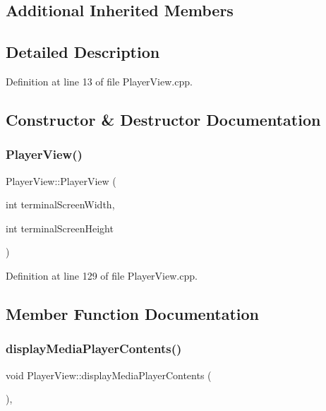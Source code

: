 \subsection*{Additional Inherited Members}


\subsection{Detailed Description}


Definition at line 13 of file Player\+View.\+cpp.



\subsection{Constructor \& Destructor Documentation}
\mbox{\label{class_player_view_a946c4788207d5373e58890a2aa798580}} 
\subsubsection{\texorpdfstring{Player\+View()}{PlayerView()}}
{\footnotesize\ttfamily Player\+View\+::\+Player\+View (\begin{DoxyParamCaption}\item[{int}]{terminal\+Screen\+Width,  }\item[{int}]{terminal\+Screen\+Height }\end{DoxyParamCaption})\hspace{0.3cm}{\ttfamily [inline]}}



Definition at line 129 of file Player\+View.\+cpp.



\subsection{Member Function Documentation}
\mbox{\label{class_player_view_a1591b9bb3c762bc45af4aa2f35cb9c11}} 
\subsubsection{\texorpdfstring{display\+Media\+Player\+Contents()}{displayMediaPlayerContents()}}
{\footnotesize\ttfamily void Player\+View\+::display\+Media\+Player\+Contents (\begin{DoxyParamCaption}{ }\end{DoxyParamCaption})\hspace{0.3cm}{\ttfamily [inline]}, {\ttfamily [private]}}



